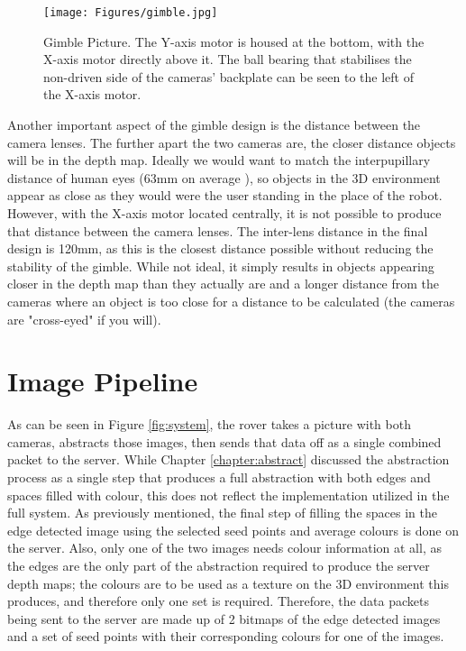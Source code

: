 \begin{figure}[H]
    \begin{center}
      \texttt{[image: Figures/gimble.jpg]}
      \caption[Gimble Picture]{Gimble Picture. The Y-axis motor is housed at the bottom, with the X-axis motor directly above it. The ball bearing that stabilises the non-driven side of the cameras' backplate can be seen to the left of the X-axis motor.}
      \label{fig:gimble}
    \end{center}
\end{figure}

Another important aspect of the gimble design is the distance between the camera lenses. The further apart the two cameras are, the closer distance objects will be in the depth map. Ideally we would want to match the interpupillary distance of human eyes (63mm on average \cite{dodgson2004variation}), so objects in the 3D environment appear as close as they would were the user standing in the place of the robot. However, with the X-axis motor located centrally, it is not possible to produce that distance between the camera lenses. The inter-lens distance in the final design is 120mm, as this is the closest distance possible without reducing the stability of the gimble. While not ideal, it simply results in objects appearing closer in the depth map than they actually are and a longer distance from the cameras where an object is too close for a distance to be calculated (the cameras are "cross-eyed" if you will).

\section{Image Pipeline}
\label{Subsection:comms}

As can be seen in Figure \ref{fig:system}, the rover takes a picture with both cameras, abstracts those images, then sends that data off as a single combined packet to the server. While Chapter \ref{chapter:abstract} discussed the abstraction process as a single step that produces a full abstraction with both edges and spaces filled with colour, this does not reflect the implementation utilized in the full system. As previously mentioned, the final step of filling the spaces in the edge detected image using the selected seed points and average colours is done on the server. Also, only one of the two images needs colour information at all, as the edges are the only part of the abstraction required to produce the server depth maps; the colours are to be used as a texture on the 3D environment this produces, and therefore only one set is required. Therefore, the data packets being sent to the server are made up of 2 bitmaps of the edge detected images and a set of seed points with their corresponding colours for one of the images.


